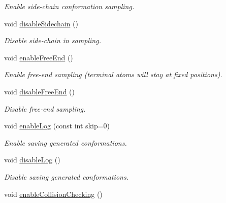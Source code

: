 \begin{DoxyCompactItemize}
\begin{DoxyCompactList}\small\item\em Enable side-\/chain conformation sampling. \end{DoxyCompactList}\item 
\hypertarget{classSLIKMCSampler_acf98f472f17ea0c02faf11d74ff5db04}{void \hyperlink{classSLIKMCSampler_acf98f472f17ea0c02faf11d74ff5db04}{disable\-Sidechain} ()}\label{classSLIKMCSampler_acf98f472f17ea0c02faf11d74ff5db04}

\begin{DoxyCompactList}\small\item\em Disable side-\/chain in sampling. \end{DoxyCompactList}\item 
\hypertarget{classSLIKMCSampler_aaea4167125ba80b2895a710057c27e4f}{void \hyperlink{classSLIKMCSampler_aaea4167125ba80b2895a710057c27e4f}{enable\-Free\-End} ()}\label{classSLIKMCSampler_aaea4167125ba80b2895a710057c27e4f}

\begin{DoxyCompactList}\small\item\em Enable free-\/end sampling (terminal atoms will stay at fixed positions). \end{DoxyCompactList}\item 
\hypertarget{classSLIKMCSampler_a99f028b7568d863f4f9b25b34633ff01}{void \hyperlink{classSLIKMCSampler_a99f028b7568d863f4f9b25b34633ff01}{disable\-Free\-End} ()}\label{classSLIKMCSampler_a99f028b7568d863f4f9b25b34633ff01}

\begin{DoxyCompactList}\small\item\em Disable free-\/end sampling. \end{DoxyCompactList}\item 
void \hyperlink{classSLIKMCSampler_a1d9ae418449460c7c4f36ac3b3b17662}{enable\-Log} (const int skip=0)
\begin{DoxyCompactList}\small\item\em Enable saving generated conformations. \end{DoxyCompactList}\item 
\hypertarget{classSLIKMCSampler_abf552bb2fcf7df9296d0938f5f455da8}{void \hyperlink{classSLIKMCSampler_abf552bb2fcf7df9296d0938f5f455da8}{disable\-Log} ()}\label{classSLIKMCSampler_abf552bb2fcf7df9296d0938f5f455da8}

\begin{DoxyCompactList}\small\item\em Disable saving generated conformations. \end{DoxyCompactList}\item 
\hypertarget{classSLIKMCSampler_a50b09332cbd488f13bbe26aeac3f0eb0}{void \hyperlink{classSLIKMCSampler_a50b09332cbd488f13bbe26aeac3f0eb0}{enable\-Collision\-Checking} ()}\label{classSLIKMCSampler_a50b09332cbd488f13bbe26aeac3f0eb0}


\end{DoxyCompactItemize}
